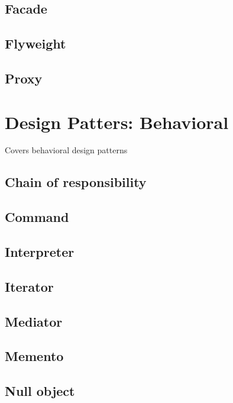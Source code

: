 \documentclass[]{article}
\begin{document}
\subsection{Facade}\label{facade}

\subsection{Flyweight}\label{flyweight}

\subsection{Proxy}\label{proxy}

\section{Design Patters: Behavioral}\label{design-patters-behavioral}

Covers behavioral design patterns

\subsection{Chain of responsibility}\label{chain-of-responsibility}

\subsection{Command}\label{command}

\subsection{Interpreter}\label{interpreter}

\subsection{Iterator}\label{iterator}

\subsection{Mediator}\label{mediator}

\subsection{Memento}\label{memento}

\subsection{Null object}\label{null-object}
\end{document}
